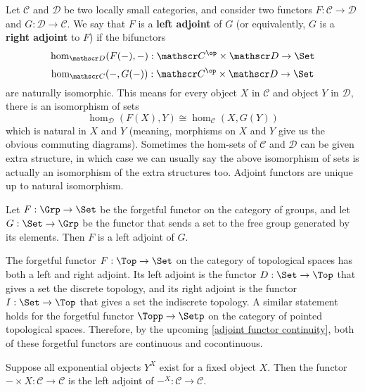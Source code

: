Let $\mathscr C$ and $\mathscr D$ be two locally small categories, and consider two functors $F : \mathscr C \rightarrow \mathscr D$ and $G : \mathscr D \rightarrow \mathscr C$. We say that $F$ is a \textbf{left adjoint} of $G$ (or equivalently, $G$ is a \textbf{right adjoint} to $F$) if the bifunctors 
\[ \hom_{\mathscr D}(F(-),-) : \mathscr C^\op \times \mathscr D \rightarrow \Set \]
\[ \hom_{\mathscr C}(-,G(-)) : \mathscr C^\op \times \mathscr D \rightarrow \Set \]
are naturally isomorphic. This means for every object $X$ in $\mathscr C$ and object $Y$ in $\mathscr D$, there is an isomorphism of sets
\[ \hom_{\mathscr D}(F(X),Y) \cong \hom_{\mathscr C}(X,G(Y)) \]
which is natural in $X$ and $Y$ (meaning, morphisms on $X$ and $Y$ give us the obvious commuting diagrams). Sometimes the hom-sets of $\mathscr C$ and $\mathscr D$ can be given extra structure, in which case we can usually say the above isomorphism of sets is actually an isomorphism of the extra structures too. Adjoint functors are unique up to natural isomorphism. 

\begin{example}
Let $F : \Grp \rightarrow \Set$ be the forgetful functor on the category of groups, and let $G : \Set \rightarrow \Grp$ be the functor that sends a set to the free group generated by its elements. Then $F$ is a left adjoint of $G$.
\end{example}

\begin{example}
\label{forgetful functor on Top}
The forgetful functor $F : \Top \rightarrow \Set$ on the category of topological spaces has both a left and right adjoint. Its left adjoint is the functor $D : \Set \rightarrow \Top$ that gives a set the discrete topology, and its right adjoint is the functor $I : \Set \rightarrow \Top$ that gives a set the indiscrete topology. A similar statement holds for the forgetful functor $\Topp \rightarrow \Setp$ on the category of pointed topological spaces. Therefore, by the upcoming \cref{adjoint functor continuity}, both of these forgetful functors are continuous and cocontinuous.
\end{example}

\begin{example}
\label{product-exponential adjoint}
Suppose all exponential objects $Y^X$ exist for a fixed object $X$. Then the functor $-\times X : \mathscr C \rightarrow \mathscr C$ is the left adjoint of $-^X : \mathscr C \rightarrow \mathscr C$. 
\end{example}

